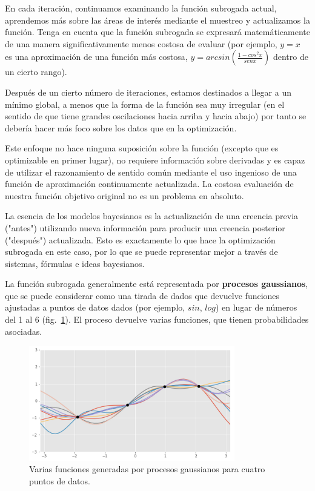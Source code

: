 \documentclass[a4paper,12pt]{article}
\begin{document}
En cada iteración, continuamos examinando la función subrogada actual, aprendemos más sobre las áreas de interés mediante el muestreo y actualizamos la función. Tenga en cuenta que la función subrogada se expresará matemáticamente de una manera significativamente menos costosa de evaluar (por ejemplo, $y=x$ es una aproximación de una función más costosa, $y = arcsin \left( \frac{1-cos^2x}{sen x} \right)$ dentro de un cierto rango).

Después de un cierto número de iteraciones, estamos destinados a llegar a un mínimo global, a menos que la forma de la función sea muy irregular (en el sentido de que tiene grandes oscilaciones hacia arriba y hacia abajo) por tanto se debería hacer más foco sobre los datos que en la optimización.

\clearpage

Este enfoque no hace ninguna suposición sobre la función (excepto que es optimizable en primer lugar), no requiere información sobre derivadas y es capaz de utilizar el razonamiento de sentido común mediante el uso ingenioso de una función de aproximación continuamente actualizada. La costosa evaluación de nuestra función objetivo original no es un problema en absoluto.

La esencia de los modelos bayesianos es la actualización de una creencia previa ("antes") utilizando nueva información para producir una creencia posterior ("después") actualizada. Esto es exactamente lo que hace la optimización subrogada en este caso, por lo que se puede representar mejor a través de sistemas, fórmulas e ideas bayesianos.

La función subrogada generalmente está representada por \textbf{procesos gaussianos}, que se puede considerar como una tirada de dados que devuelve funciones ajustadas a puntos de datos dados (por ejemplo, $sin$, $log$) en lugar de números del 1 al 6 (fig.~\ref{fig:bayes4}). El proceso devuelve varias funciones, que tienen probabilidades asociadas.

\begin{figure}[H]
	\begin{center}
		\includegraphics[width=0.8\textwidth]{bayes_opt_4.png}
		\caption{Varias funciones generadas por procesos gaussianos para cuatro puntos de datos. \citep{Ye2020Oct}}
		\label{fig:bayes4}
	\end{center}
\end{figure}
\end{document}
